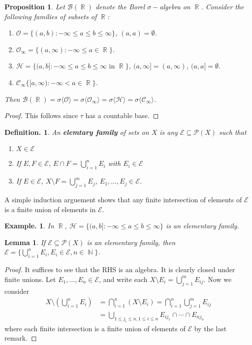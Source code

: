 \documentclass[12pt, a4paper]{memoir}
\DeclareMathOperator{\N}{{\mathbb{N}}}
\DeclareMathOperator{\R}{{\mathbb{R}}}
\newtheorem{lemma}[theorem]{Lemma}
\newtheorem{proposition}[theorem]{Proposition}
\theoremstyle{nonumberplain}
\newtheorem{definition}{Definition.}
\newtheorem{example}{Example.}
\newtheorem{proof}{Proof}
\begin{document}
\begin{proposition}
    Let $\mathcal{B}(\R)$ denote the Borel $\sigma-$algebra on $\R$.
    Consider the following families of subsets of $\R$:
    \begin{enumerate}[nolistsep]
        \item $\mathcal{O}=\{(a,b):-\infty\leq a\leq b\leq\infty\}$, $(a,a)=\emptyset$.
        \item $\mathcal{O}_\infty=\{(a,\infty):-\infty\leq a\in\R\}$.
        \item $\mathcal{H}=\{(a,b]:-\infty\leq a\leq b\leq\infty\text{ in }\R\}$, $(a,\infty]=(a,\infty)$, $(a,a]=\emptyset$.
        \item $\mathcal{C}_\infty\{[a,\infty):-\infty<a\in\R\}$.
    \end{enumerate}
    Then $\mathcal{B}(\R)=\sigma\langle\mathcal{O}\rangle=\sigma\langle\mathcal{O}_\infty\rangle=\sigma\langle\mathcal{H}\rangle=\sigma\langle\mathcal{C}_\infty\rangle$.
\end{proposition}
\begin{proof}
    This follows since $\tau$ has a countable base.
\end{proof}
\begin{definition}
    An \textbf{elemtary family} of sets on $X$ is any $\mathcal{E}\subseteq\mathcal{P}(X)$ such that
    \begin{enumerate}[nolistsep,label=(\roman*)]
        \item $X\in\mathcal{E}$
        \item If $E,F\in\mathcal{E}$, $E\cap F=\bigcup_{i=1}^n E_i$ with $E_i\in\mathcal{E}$
        \item If $E\in\mathcal{E}$, $X\setminus F=\bigcup_{j=1}^m E_j$, $E_1,\ldots,E_j\in\mathcal{E}$.
    \end{enumerate}
\end{definition}
A simple induction arguement shows that any finite intersection of elements of $\mathcal{E}$ is a finite union of elements in $\mathcal{E}$.
\begin{example}
    In $\R$, $\mathcal{H}=\{(a,b]:-\infty\leq a\leq b\leq\infty\}$ is an elementary family. %
\end{example}
\begin{lemma}
    If $\mathcal{E}\subseteq\mathcal{P}(X)$ is an elementary family, then $\mathcal{E}=\{\bigcup_{i=1}^n E_i,E_i\in\mathcal{E},n\in\N\}$.
\end{lemma}
\begin{proof}
    It suffices to see that the RHS is an algebra.
    It is clearly closed under finite unions.
    Let $E_1,\ldots,E_n\in\mathcal{E}$, and write each $X\setminus E_i=\bigcup_{j=1}^m E_{ij}$.
    Now we consider
    \begin{align*}
        X\setminus\left(\bigcup_{i=1}^n E_i\right)&=\bigcap_{i=1}^n(X\setminus E_i)=\bigcap_{i=1}^n\bigcup_{j=1}^m E_{ij}\\
                                                  &=\bigcup_{1\leq j_i\leq n,1\leq i\leq n}E_{ij_1}\cap\cdots\cap E_{nj_n}
    \end{align*}
    where each finite intersection is a finite union of elements of $\mathcal{E}$ by the last remark.
\end{proof}
\end{document}
